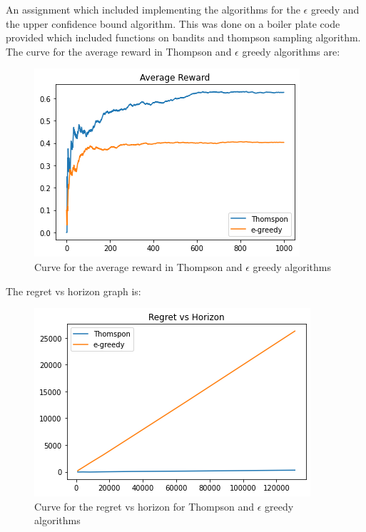 \documentclass[12pt]{article}
\begin{document}
An assignment which included implementing the algorithms for the $\epsilon$ greedy and the upper confidence bound algorithm. This was done on a boiler plate code provided which included functions on bandits and thompson sampling algorithm. The curve for the average reward in Thompson and $\epsilon$ greedy algorithms are:
\begin{figure}[H]

\centering
\includegraphics[width=\textwidth]{th_e.png}
\caption{Curve for the average reward in Thompson and $\epsilon$ greedy algorithms}
\end{figure}
  \newpage
The regret vs horizon graph is:
\begin{figure}[H]

\centering
\includegraphics[width=\textwidth]{rvh.png}
\caption{Curve for the regret vs horizon for Thompson and $\epsilon$ greedy algorithms}
\end{figure}
\end{document}
